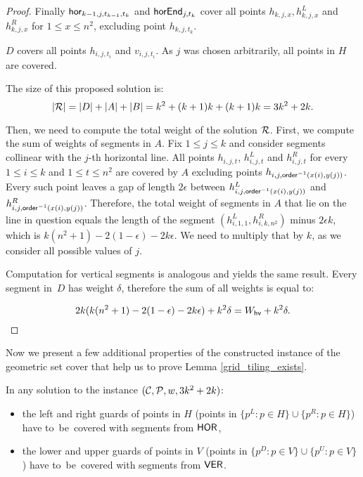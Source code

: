 \begin{proof}
Finally $\mathsf{hor}_{k-1,j,t_{k-1},t_k}$ and $\mathsf{horEnd}_{j,t_k}$
cover all points $h_{k,j,x}, h_{k,j,x}^L$ and $h_{k,j,x}^R$
for ${1 \le x \le n^2}$, excluding point $h_{k,j,t_k}$.

$D$ covers all points $h_{i,j,t_i}$ and $v_{i,j,t_i}$.
As $j$ was chosen arbitrarily, all points in $H$ are covered.

The size of this proposed solution is:
$$|\mathcal{R}| = |D| + |A| + |B| = k^2 + (k+1)k + (k+1)k = 3k^2+2k.$$

Then, we need to compute the total weight of the solution $\mathcal{R}$.
First, we compute the sum of weights of segments in $A$.
Fix $1 \le j \le k$ and consider segments collinear
with the $j$-th horizontal line.
All points $h_{i,j,t}$, $h_{i,j,t}^L$ and $h_{i,j,t}^R$
for every $1 \le i \le k$ and $1 \le t \le n^2$ are covered by $A$
excluding points $h_{i,j,\mathsf{order}^{-1}(x(i),y(j))}$.
Every such point leaves a gap of length $2\epsilon$ between
$h_{i,j,\mathsf{order}^{-1}(x(i),y(j))}^L$ and $h_{i,j,\mathsf{order}^{-1}(x(i),y(j))}^R$.
Therefore, the total weight of segments in $A$
that lie on the line in question equals the length of the segment
$(h_{i,1,1}^L, h_{i,k,n^2}^R)$
minus $2\epsilon k$, which is $k(n^2+1) -2(1-\epsilon)-2k\epsilon$.
We need to multiply that by $k$, as we consider all possible values of $j$.

Computation for vertical segments is analogous and yields the same result.
Every segment in~$D$ has weight $\delta$, therefore the sum of all weights
is equal to:

$$2k(k(n^2+1) -2(1-\epsilon)-2k\epsilon) + k^2\delta= W_{\mathsf{hv}}+k^2\delta.\qedhere$$
\end{proof}

Now we present a few additional properties of the constructed instance
of the geometric set cover that help us to prove
Lemma \ref{grid_tiling_exists}.

\begin{claim}
\label{guards}
In any solution to the instance $(\mathcal{C}, \mathcal{P}, w, 3k^2+2k)$:
\begin{itemize}
\item the left and right guards of points in $H$
(points in $\{p^L : p \in H\} \cup \{p^R : p \in H\}$)
have to~be~covered with segments from $\mathsf{HOR}$,
\item the lower and upper guards of points in $V$
(points in $\{p^D : p \in V\} \cup \{p^U : p \in V\}$)
have to~be~covered with segments from $\mathsf{VER}$.
\end{itemize}
\end{claim}

